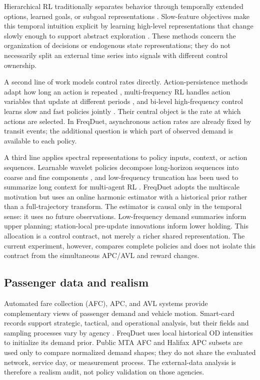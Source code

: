 \documentclass[preprint,12pt,authoryear,nopreprintline]{elsarticle}
\begin{document}
Hierarchical RL traditionally separates behavior through temporally
extended options, learned goals, or subgoal representations
\citep{sutton1999between, nachum2018data}. Slow-feature objectives make
this temporal intuition explicit by learning high-level representations
that change slowly enough to support abstract exploration
\citep{li2021slow}. These methods concern the organization of decisions
or endogenous state representations; they do not necessarily split an
external time series into signals with different control ownership.

A second line of work models control rates directly. Action-persistence
methods adapt how long an action is repeated
\citep{metelli2020persistence}, multi-frequency RL handles action
variables that update at different periods \citep{lee2020multiple}, and
bi-level high-frequency control learns slow and fast policies jointly
\citep{holt2025evocontrol}. Their central object is the rate at which
actions are selected. In FreqDuet, asynchronous action rates are already
fixed by transit events; the additional question is which part of
observed demand is available to each policy.

A third line applies spectral representations to policy inputs, context,
or action sequences. Learnable wavelet policies decompose long-horizon
sequences into coarse and fine components \citep{huang2025wavelet}, and
low-frequency truncation has been used to summarize long context for
multi-agent RL \citep{duan2025adaptive}. FreqDuet adopts the multiscale
motivation but uses an online harmonic estimator with a historical prior
rather than a full-trajectory transform. The estimator is causal only in
the temporal sense: it uses no future observations. Low-frequency demand
summaries inform upper planning; station-local pre-update innovations
inform lower holding. This allocation is a control contract, not merely
a richer shared representation. The current experiment, however,
compares complete policies and does not isolate this contract from the
simultaneous APC/AVL and reward changes.

\subsection{Passenger data and
realism}\label{passenger-data-and-realism}

Automated fare collection (AFC), APC, and AVL systems provide
complementary views of passenger demand and vehicle motion. Smart-card
records support strategic, tactical, and operational analysis, but their
fields and sampling processes vary by agency \citep{pelletier2011smart}.
FreqDuet uses local historical OD intensities to initialize its demand
prior. Public MTA AFC and Halifax APC subsets are used only to compare
normalized demand shapes; they do not share the evaluated network,
service day, or measurement process. The external-data analysis is
therefore a realism audit, not policy validation on those agencies.
\end{document}
